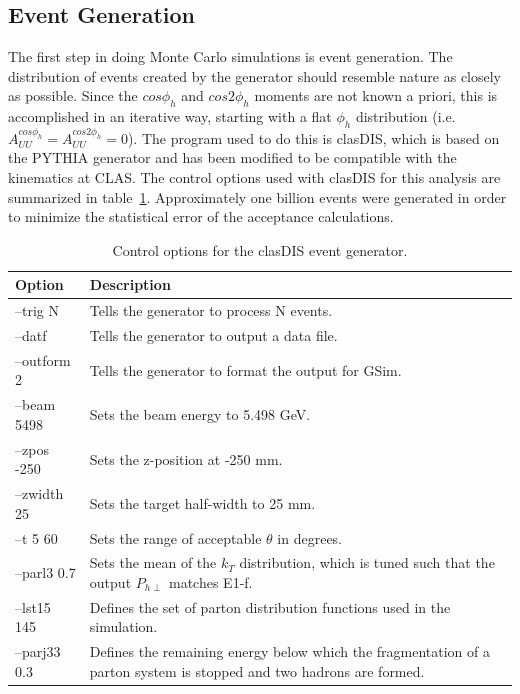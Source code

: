 \subsection{Event Generation}
\label{subsec:EventGeneration}
%
The first step in doing Monte Carlo simulations is event generation.
The distribution of events created by the generator should resemble nature as closely as possible.
Since the $cos\phi_h$ and $cos2\phi_h$ moments are not known a priori, this is accomplished in an iterative way, starting with a flat $\phi_h$ distribution (i.e. $A^{cos\phi_h}_{UU} = A^{cos2\phi_h}_{UU} = 0$).
The program used to do this is clasDIS, which is based on the PYTHIA generator and has been modified to be compatible with the kinematics at CLAS.
The control options used with clasDIS for this analysis are summarized in table~\ref{tab:clasDIScontrolOpts}.
Approximately one billion events were generated in order to minimize the statistical error of the acceptance calculations.
%
\begin{table}[htp]
\centering
\begin{tabular}{ p{4cm} p{10cm} }
\hline
\textbf{Option} & \textbf{Description} \\ \hline
--trig N & Tells the generator to process N events. \\
--datf & Tells the generator to output a data file. \\
--outform 2 & Tells the generator to format the output for GSim. \\
--beam 5498 & Sets the beam energy to 5.498 GeV. \\
--zpos -250 & Sets the z-position at -250 mm. \\
--zwidth 25 & Sets the target half-width to 25 mm. \\
--t 5 60 & Sets the range of acceptable $\theta$ in degrees. \\
--parl3 0.7 & Sets the mean of the $k_T$ distribution, which is tuned such that the output $P_{h\perp}$ matches E1-f. \\
--lst15 145 & Defines the set of parton distribution functions used in the simulation. \\
--parj33 0.3 & Defines the remaining energy below which the fragmentation of a parton system is stopped and two hadrons are formed. \\
\hline
\end{tabular}
\caption{Control options for the clasDIS event generator.}
\label{tab:clasDIScontrolOpts}
\end{table}
%
